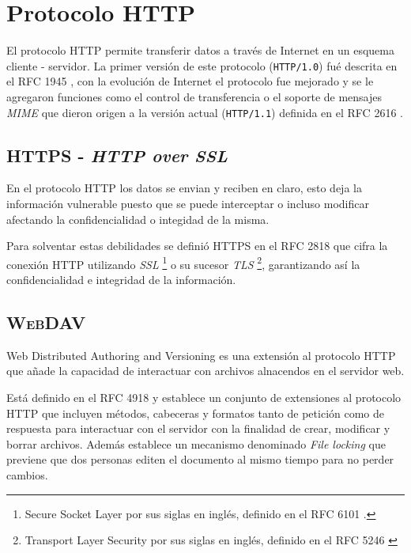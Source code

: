 \section {Protocolo \textsc{HTTP}}

El protocolo \textsc{HTTP} permite transferir datos a trav\'{e}s de Internet en un esquema cliente - servidor. La primer versi\'{o}n de este protocolo (\texttt{HTTP/1.0}) fu\'{e} descrita en el \textsc{RFC} 1945 \cite{_rfc_????-1}, con la evoluci\'{o}n de Internet el protocolo fue mejorado y se le agregaron funciones como el control de transferencia o el soporte de mensajes \textit{MIME} que dieron origen a la versi\'{o}n actual (\texttt{HTTP/1.1}) definida en el RFC 2616 \cite{_rfc_????}.

  \subsection {\textsc{HTTPS} - \textit{HTTP over SSL}}

En el protocolo \textsc{HTTP} los datos se envian y reciben en claro, esto deja la informaci\'{o}n vulnerable puesto que se puede interceptar o incluso modificar afectando la confidencialidad o integidad de la misma.

Para solventar estas debilidades se defini\'{o} \textsc{HTTPS} en el \textsc{RFC} 2818 \cite{_rfc_????-6} que cifra la conexi\'{o}n \textsc{HTTP} utilizando \textit{SSL} \footnote{Secure Socket Layer por sus siglas en ingl\'{e}s, definido en el \textsc{RFC} 6101 \cite{_rfc_????-4}.} o su sucesor \textit{TLS} \footnote{Transport Layer Security por sus siglas en ingl\'{e}s, definido en el \textsc{RFC} 5246 \cite{_rfc_????-3}}, garantizando as\'{i} la confidencialidad e integridad de la informaci\'{o}n.

  \subsection {\textsc{WebDAV}}

Web Distributed Authoring and Versioning es una extensi\'{o}n al protocolo \textsc{HTTP} que a\~{n}ade la capacidad de interactuar con archivos alnacendos en el servidor web.

Est\'{a} definido en el \textsc{RFC} 4918 \cite{_rfc_????-2} y establece un conjunto de extensiones al protocolo \textsc{HTTP} que incluyen m\'{e}todos, cabeceras y formatos tanto de petici\'{o}n como de respuesta para interactuar con el servidor con la finalidad de crear, modificar y borrar archivos. Adem\'{a}s establece un mecanismo denominado \textit{File locking} que previene que dos personas editen el documento al mismo tiempo para no perder cambios.

